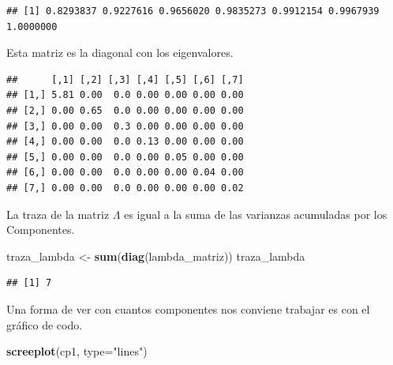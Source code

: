 \documentclass[
]{book}
\newenvironment{Shaded}{\begin{snugshade}}{\end{snugshade}}
\newcommand{\AttributeTok}[1]{\textcolor[rgb]{0.13,0.29,0.53}{#1}}
\newcommand{\DecValTok}[1]{\textcolor[rgb]{0.00,0.00,0.81}{#1}}
\newcommand{\FunctionTok}[1]{\textcolor[rgb]{0.13,0.29,0.53}{\textbf{#1}}}
\newcommand{\NormalTok}[1]{#1}
\newcommand{\OtherTok}[1]{\textcolor[rgb]{0.56,0.35,0.01}{#1}}
\newcommand{\SpecialCharTok}[1]{\textcolor[rgb]{0.81,0.36,0.00}{\textbf{#1}}}
\newcommand{\StringTok}[1]{\textcolor[rgb]{0.31,0.60,0.02}{#1}}
\begin{document}
\begin{Shaded}
\end{Shaded}

\begin{verbatim}
## [1] 0.8293837 0.9227616 0.9656020 0.9835273 0.9912154 0.9967939 1.0000000
\end{verbatim}

Esta matriz es la diagonal con los eigenvalores.

\begin{Shaded}
\end{Shaded}

\begin{verbatim}
##      [,1] [,2] [,3] [,4] [,5] [,6] [,7]
## [1,] 5.81 0.00  0.0 0.00 0.00 0.00 0.00
## [2,] 0.00 0.65  0.0 0.00 0.00 0.00 0.00
## [3,] 0.00 0.00  0.3 0.00 0.00 0.00 0.00
## [4,] 0.00 0.00  0.0 0.13 0.00 0.00 0.00
## [5,] 0.00 0.00  0.0 0.00 0.05 0.00 0.00
## [6,] 0.00 0.00  0.0 0.00 0.00 0.04 0.00
## [7,] 0.00 0.00  0.0 0.00 0.00 0.00 0.02
\end{verbatim}

La traza de la matriz \(\Lambda\) es igual a la suma de las varianzas acumuladas por los Componentes.

\begin{Shaded}
\begin{Highlighting}[]
\NormalTok{traza\_lambda }\OtherTok{\textless{}{-}} \FunctionTok{sum}\NormalTok{(}\FunctionTok{diag}\NormalTok{(lambda\_matriz))}
\NormalTok{traza\_lambda}
\end{Highlighting}
\end{Shaded}

\begin{verbatim}
## [1] 7
\end{verbatim}

Una forma de ver con cuantos componentes nos conviene trabajar es con el gráfico de codo.

\begin{Shaded}
\begin{Highlighting}[]
\FunctionTok{screeplot}\NormalTok{(cp1, }\AttributeTok{type=}\StringTok{"lines"}\NormalTok{)}
\end{Highlighting}
\end{Shaded}
\end{document}
